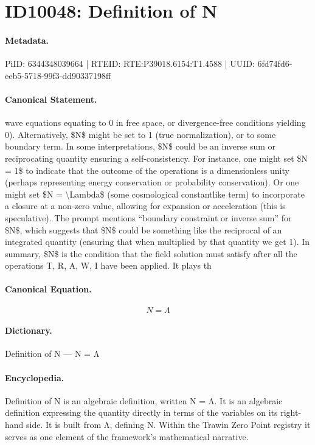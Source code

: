 \section*{ID10048: Definition of N}
\paragraph{Metadata.}
PiID: 6344348039664 | RTEID: RTE:P39018.6154:T1.4588 | UUID: 6fd74fd6-eeb5-5718-99f3-dd90337198ff

\paragraph{Canonical Statement.}
wave equations equating to 0 in free space, or divergence-free conditions yielding 0). Alternatively, \$N\$ might be set to 1 (true normalization), or to some boundary term. In some interpretations, \$N\$ could be an inverse sum or reciprocating quantity ensuring a self-consistency. For instance, one might set \$N = 1\$ to indicate that the outcome of the operations is a dimensionless unity (perhaps representing energy conservation or probability conservation). Or one might set \$N = \textbackslash{}Lambda\$ (some cosmological constantlike term) to incorporate a closure at a non-zero value, allowing for expansion or acceleration (this is speculative). The prompt mentions “boundary constraint or inverse sum” for \$N\$, which suggests that \$N\$ could be something like the reciprocal of an integrated quantity (ensuring that when multiplied by that quantity we get 1). In summary, \$N\$ is the condition that the field solution must satisfy after all the operations T, R, A, W, I have been applied. It plays th

\paragraph{Canonical Equation.}
\[
N = \Lambda
\]

\paragraph{Dictionary.}
Definition of N — N = Λ

\paragraph{Encyclopedia.}
Definition of N is an algebraic definition, written N = Λ. It is an algebraic definition expressing the quantity directly in terms of the variables on its right-hand side. It is built from Λ, defining N. Within the Trawin Zero Point registry it serves as one element of the framework's mathematical narrative.
